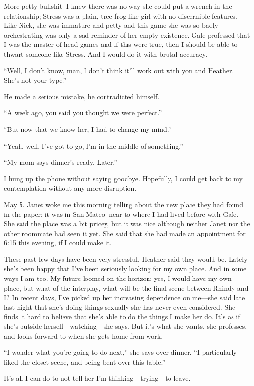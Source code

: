 More petty bullshit. I knew there was no way she could put a wrench in
the relationship; Stress was a plain, tree frog-like girl with no
discernible features. Like Nick, she was immature and petty and this
game she was so badly orchestrating was only a sad reminder of her empty
existence. Gale professed that I was the master of head games and if
this were true, then I should be able to thwart someone like Stress. And
I would do it with brutal accuracy.

``Well, I don't know, man, I don't think it'll work out with you and
Heather. She's not your type.''

He made a serious mistake, he contradicted himself.

``A week ago, you said you thought we were perfect.''

``But now that we know her, I had to change my mind.''

``Yeah, well, I've got to go, I'm in the middle of something.''

``My mom says dinner's ready. Later.''

I hung up the phone without saying goodbye. Hopefully, I could get back
to my contemplation without any more disruption.

May 5. Janet woke me this morning telling about the new place they had
found in the paper; it was in San Mateo, near to where I had lived
before with Gale. She said the place was a bit pricey, but it was nice
although neither Janet nor the other roommate had seen it yet. She said
that she had made an appointment for 6:15 this evening, if I could make
it.

These past few days have been very stressful. Heather said they would
be. Lately she's been happy that I've been seriously looking for my own
place. And in some ways I am too. My future loomed on the horizon; yes,
I would have my own place, but what of the interplay, what will be the
final scene between Rhindy and I? In recent days, I've picked up her
increasing dependence on me---she said late last night that she's doing
things sexually she has never even considered. She finds it hard to
believe that she's able to do the things I make her do. It's as if she's
outside herself---watching---she says. But it's what she wants, she
professes, and looks forward to when she gets home from work.

``I wonder what you're going to do next,'' she says over dinner. ``I
particularly liked the closet scene, and being bent over this table.''

It's all I can do to not tell her I'm thinking---trying---to leave.

